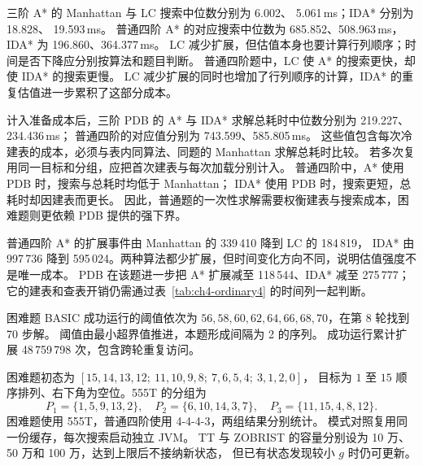 三阶 A* 的 Manhattan 与 LC 搜索中位数分别为 6.002、
5.061\,ms；IDA* 分别为 18.828、
19.593\,ms。
普通四阶 A* 的对应搜索中位数为 685.852、508.963\,ms，
IDA* 为 196.860、364.377\,ms。
LC 减少扩展，但估值本身也要计算行列顺序；时间是否下降应分别按算法和题目判断。
普通四阶题中，LC 使 A* 的搜索更快，却使 IDA* 的搜索更慢。
LC 减少扩展的同时也增加了行列顺序的计算，IDA* 的重复估值进一步累积了这部分成本。

计入准备成本后，三阶 PDB 的 A* 与 IDA* 求解总耗时中位数分别为 219.227、234.436\,ms；
普通四阶的对应值分别为 743.599、585.805\,ms。
这些值包含每次冷建表的成本，必须与表内同算法、同题的 Manhattan 求解总耗时比较。
若多次复用同一目标和分组，应把首次建表与每次加载分别计入。
普通四阶中，A* 使用 PDB 时，搜索与总耗时均低于 Manhattan；
IDA* 使用 PDB 时，搜索更短，总耗时却因建表而更长。
因此，普通题的一次性求解需要权衡建表与搜索成本，困难题则更依赖 PDB 提供的强下界。
\FloatBarrier

\par\vspace{2bp}

普通四阶 A* 的扩展事件由 Manhattan 的 339\,410 降到 LC 的 184\,819，
IDA* 由 997\,736 降到 595\,024。两种算法都少扩展，但时间变化方向不同，说明估值强度不是唯一成本。
PDB 在该题进一步把 A* 扩展减至 118\,544、IDA* 减至 275\,777；
它的建表和查表开销仍需通过表~\ref{tab:ch4-ordinary4} 的时间列一起判断。

困难题 BASIC 成功运行的阈值依次为 $56,58,60,62,64,66,68,70$，在第 8 轮找到 70 步解。
阈值由最小超界值推进，本题形成间隔为 2 的序列。
成功运行累计扩展 48\,759\,798 次，包含跨轮重复访问。
\FloatBarrier

\par\vspace{2bp}

困难题初态为 $[15,14,13,12;\ 11,10,9,8;\ 7,6,5,4;\ 3,1,2,0]$，
目标为 $1$ 至 $15$ 顺序排列、右下角为空位。555T 的分组为
\[
P_1=\{1,5,9,13,2\},\quad P_2=\{6,10,14,3,7\},\quad P_3=\{11,15,4,8,12\}.
\]
困难题使用 555T，普通四阶使用 4-4-4-3，两组结果分别统计。
模式对照复用同一份缓存，每次搜索启动独立 JVM。
TT 与 ZOBRIST 的容量分别设为 10 万、50 万和 100 万，达到上限后不接纳新状态，
但已有状态发现较小 $g$ 时仍可更新。

